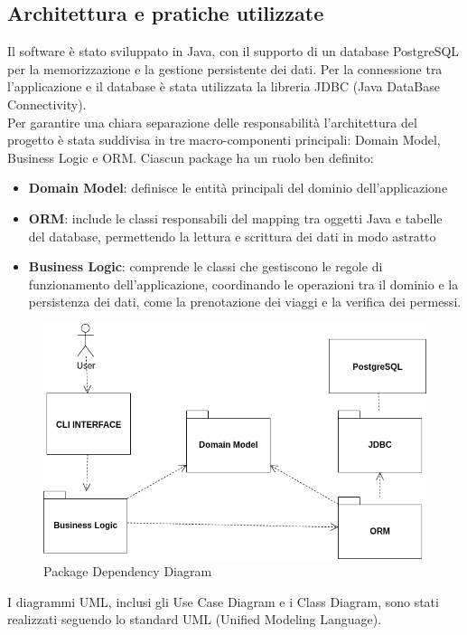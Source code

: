 \subsection{Architettura e pratiche utilizzate}
Il software è stato sviluppato in Java, con il supporto di un database PostgreSQL per la memorizzazione e la gestione persistente dei dati. Per la connessione tra l’applicazione e il database è stata utilizzata la libreria JDBC (Java DataBase Connectivity).\\
\noindent
Per garantire una chiara separazione delle responsabilità l'architettura del progetto è stata suddivisa in tre macro-componenti principali: Domain Model, Business Logic e ORM. Ciascun package ha un ruolo ben definito:
\begin{itemize}
\item \textbf{Domain Model}: definisce le entità principali del dominio dell'applicazione
\item \textbf{ORM}: include le classi responsabili del mapping tra oggetti Java e tabelle del database, permettendo la lettura e scrittura dei dati in modo astratto
\item \textbf{Business Logic}: comprende le classi che gestiscono le regole di funzionamento dell'applicazione, coordinando le operazioni tra il dominio e la persistenza dei dati, come la prenotazione dei viaggi e la verifica dei permessi.
\end{itemize}
\begin{figure}
    \centering
    \includegraphics[width=1\linewidth]{Images/PkgDeps.png}
    \caption{Package Dependency Diagram}
    \label{fig:pkdep}
\end{figure}
I diagrammi UML, inclusi gli Use Case Diagram e i Class Diagram, sono stati realizzati seguendo lo standard UML (Unified Modeling Language).\\
